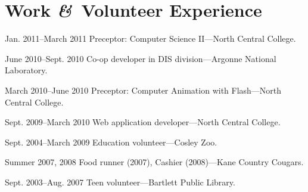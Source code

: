 \documentclass[11pt]{simplecv}
\newcommand*\amp{{\fertigopro\itshape\&}}
\begin{document}
  \section{Work \amp\ Volunteer Experience}
  \begin{topic}
    \item[Jan. 2011--March 2011] Preceptor: Computer Science II---North Central College.
    \item[June 2010--Sept. 2010] Co-op developer in DIS division---Argonne National Laboratory.
    \item[March 2010--June 2010] Preceptor: Computer Animation with Flash---North Central College.
    \item[Sept. 2009--March 2010] Web application developer---North Central College.
    \item[Sept. 2004--March 2009] Education volunteer---Cosley Zoo.
    \item[Summer 2007, 2008] Food runner (2007), Cashier (2008)---Kane Country Cougars.
    \item[Sept. 2003--Aug. 2007] Teen volunteer---Bartlett Public Library.
  \end{topic}
\end{document}
